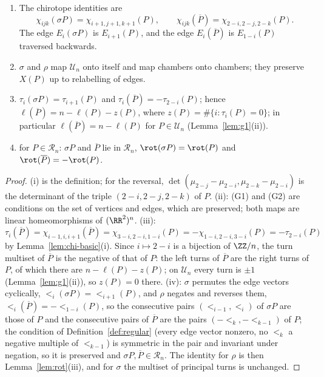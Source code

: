 \begin{lemma}\label{lem:shift}\leanok
\begin{enumerate}
\item[(i)] The chirotope identities are
\[
 \chi_{ijk}(\sigma P)=\chi_{i+1,j+1,k+1}(P),\qquad
 \chi_{ijk}(\overline P)=\chi_{2-i,2-j,2-k}(P).
\]
The edge $E_i(\sigma P)$ is $E_{i+1}(P)$, and the edge
$E_i(\overline P)$ is $E_{1-i}(P)$ traversed backwards.
\item[(ii)] $\sigma$ and $\rho$ map $\mathcal U_n$ onto itself and map chambers
onto chambers; they preserve $X(P)$ up to relabelling of edges.
\item[(iii)] $\tau_i(\sigma P)=\tau_{i+1}(P)$ and $\tau_i(\overline P)=-\tau_{2-i}(P)$;
hence $\ell(\overline P)=n-\ell(P)-z(P)$, where $z(P)=\#\{i:\tau_i(P)=0\}$;
in particular $\ell(\overline P)=n-\ell(P)$ for $P\in\mathcal U_n$
(Lemma~\ref{lem:g1}(ii)).
\item[(iv)] for $P\in\mathcal R_n$: $\sigma P$ and $\overline P$ lie in
$\mathcal R_n$, $\rot(\sigma P)=\rot(P)$ and $\rot(\overline P)=-\rot(P)$.
\end{enumerate}

\end{lemma}
\begin{proof}\leanok{}
(i) is the definition; for the reversal, $\det(\mu_{2-j}-\mu_{2-i},\mu_{2-k}-\mu_{2-i})$
is the determinant of the triple $(2-i,2-j,2-k)$ of $P$. (ii): (G1) and (G2) are
conditions on the set of vertices and edges, which are preserved; both maps are
linear homeomorphisms of $(\RR^2)^n$. (iii): $\tau_i(\overline P)=
\chi_{i-1,i,i+1}(\overline P)=\chi_{3-i,2-i,1-i}(P)=-\chi_{1-i,2-i,3-i}(P)
=-\tau_{2-i}(P)$ by Lemma~\ref{lem:chi-basic}(i). Since $i\mapsto2-i$ is a
bijection of $\ZZ/n$, the turn multiset of $\overline P$ is the negative of
that of $P$: the left turns of $\overline P$ are the right turns of $P$, of
which there are $n-\ell(P)-z(P)$; on $\mathcal U_n$ every turn is $\pm1$
(Lemma~\ref{lem:g1}(ii)), so $z(P)=0$ there.
(iv): $\sigma$ permutes the edge vectors cyclically,
$\lt_i(\sigma P)=\lt_{i+1}(P)$, and $\rho$ negates and reverses them,
$\lt_i(\overline P)=-\lt_{1-i}(P)$, so the consecutive pairs
$(\lt_{i-1},\lt_i)$ of $\sigma P$ are those of $P$ and the consecutive pairs
of $\overline P$ are the pairs $(-\lt_k,-\lt_{k-1})$ of $P$; the condition of
Definition~\ref{def:regular} (every edge vector nonzero, no $\lt_k$ a negative
multiple of $\lt_{k-1}$) is symmetric in the pair and invariant under
negation, so it is preserved and $\sigma P,\overline P\in\mathcal R_n$. The
identity for $\rho$ is then Lemma~\ref{lem:rot}(iii), and for $\sigma$ the
multiset of principal turns is unchanged.
\end{proof}


